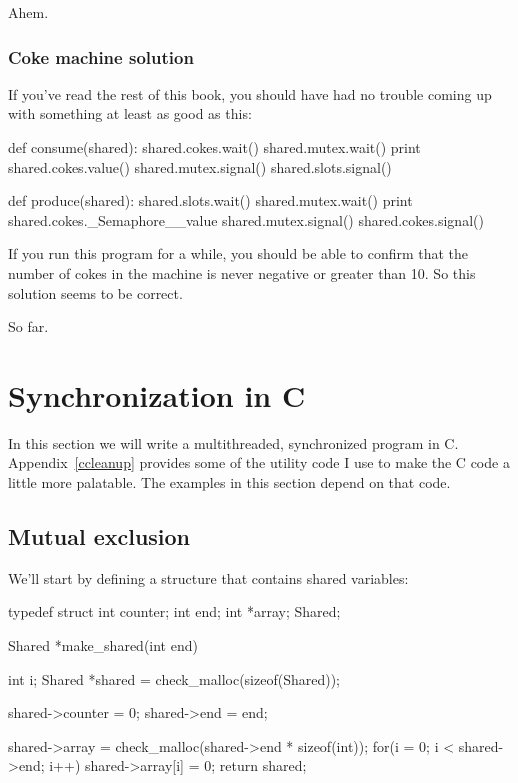 \documentclass{book}
\begin{document}
Ahem.



\subsection {Coke machine solution}

If you've read the rest of this book, you should have had no
trouble coming up with something at least as good as this:

\begin{unbreakable}[title={}]{}
def consume(shared):
    shared.cokes.wait()
    shared.mutex.wait()
    print shared.cokes.value()
    shared.mutex.signal()
    shared.slots.signal()

def produce(shared):
    shared.slots.wait()
    shared.mutex.wait()
    print shared.cokes._Semaphore__value
    shared.mutex.signal()
    shared.cokes.signal()
\end{unbreakable}

If you run this program for a while, you should be able to confirm
that the number of cokes in the machine is never negative or greater
than 10.  So this solution seems to be correct.

So far.


\chapter{Synchronization in C}
\label{csync}

In this section we will write a multithreaded, synchronized
program in C.  Appendix~\ref{ccleanup} provides some of the utility
code I use to make the C code a little more palatable.  The
examples in this section depend on that code.

\section{Mutual exclusion}

We'll start by defining a structure that contains shared
variables:

\begin{unbreakable}[title={}]{}
typedef struct {
  int counter;
  int end;
  int *array;
} Shared;

Shared *make_shared(int end) {
 int i;
 Shared *shared = 
    check_malloc(sizeof(Shared));

 shared->counter = 0;
 shared->end = end;

 shared->array = 
  check_malloc(shared->end * sizeof(int));
 for(i = 0; i < shared->end; i++) {
  shared->array[i] = 0;
 }
 return shared;
}
\end{unbreakable}
\end{document}
